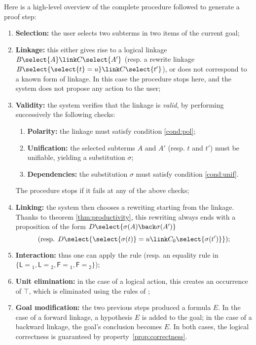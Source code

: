 Here is a high-level overview of the complete procedure followed to generate a
proof step:
\begin{enumerate}
\item \textbf{Selection:} the user selects two subterms in two items of the current goal; \label{step:selection}
\item \textbf{Linkage:} this either gives rise to a logical linkage $B\select{A}
  \link C\select{A'}$ (resp. a rewrite linkage $B\select{\select{t} = u} \link
  C\select{t'}$), or does not correspond to a known form of linkage. In this case
  the procedure stops here, and the system does not propose any action to the
  user; \label{step:linkage}
\item \textbf{Validity:} the system verifies that the linkage is \emph{valid},
  by performing successively the following checks:
  \begin{enumerate}
    \item \textbf{Polarity:} the linkage must satisfy condition \ref{cond:pol};
    \item \textbf{Unification:} the selected subterms $A$ and $A'$ (resp. $t$
    and $t'$) must be unifiable, yielding a substitution $\sigma$;
    \item \textbf{Dependencies:} the substitution $\sigma$ must satisfy
    condition \ref{cond:unif}.
  \end{enumerate}
  The procedure stops if it fails at any of the above checks;
  \label{step:validity}
\item \textbf{Linking:} the system then chooses a rewriting start\-ing from the linkage. Thanks to
  theorem \ref{thm:productivity}, this re\-writing always ends with a proposition of
  the form $D\select{\sigma(A) \back \sigma(A')}$ $$\text{(resp.
  $D\select{\select{\sigma(t)} = u \link C_0\select{\sigma(t')}}$);}$$
  \label{step:linking}
\item \textbf{Interaction:} thus one can apply the {} rule (resp. an equality rule in
$\{\mathsf{L\!\!=\!\!_1}, \mathsf{L\!\!=\!\!_2}, \mathsf{F\!\!=\!\!_1},
\mathsf{F\!\!=\!\!_2}\}$); \label{step:interaction}
\item \textbf{Unit elimination:} in the case of a logical action, this creates an occurrence of $\top$,
which is eliminated using the rules of ; \label{step:unit-elimination}
\item \textbf{Goal modification:} the two previous steps produced a formula $E$.
  In the case of a forward linkage, a hypothesis $E$ is added to the goal; in
  the case of a backward linkage, the goal's conclusion becomes $E$. In both
  cases, the logical correctness is guaranteed by
  property~\ref{prop:correctness}. \label{step:goal-modification}
\end{enumerate}

